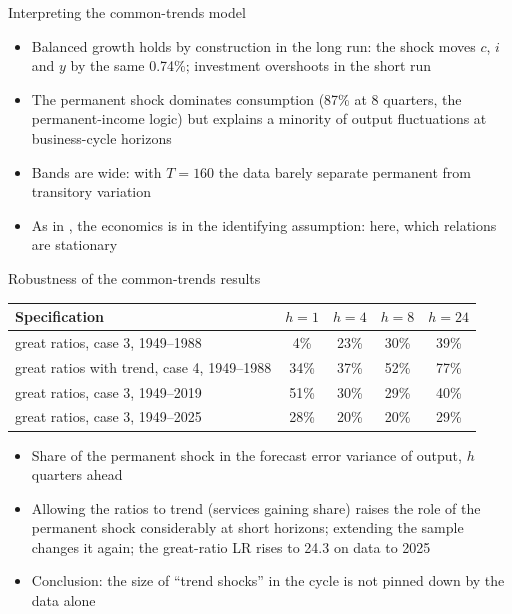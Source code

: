 \begin{frame}{Interpreting the common-trends model}
\itemsize{\small}
\begin{itemize}
    \item Balanced growth holds by construction in the long run: the shock moves $c$, $i$ and $y$ by the same 0.74\%; investment overshoots in the short run
    \item The permanent shock dominates consumption (87\% at 8 quarters, the permanent-income logic) but explains a minority of output fluctuations at business-cycle horizons
    \item Bands are wide: with $T = 160$ the data barely separate permanent from transitory variation
    \item As in , the economics is in the identifying assumption: here, which relations are stationary
\end{itemize}
\end{frame}

\begin{frame}{Robustness of the common-trends results}
\itemsize{\small}
\begin{center}
\footnotesize
\begin{tabular}{lcccc}
\toprule
\textbf{Specification} & $h = 1$ & $h = 4$ & $h = 8$ & $h = 24$ \\
\midrule
great ratios, case 3, 1949--1988 & 4\% & 23\% & 30\% & 39\% \\
great ratios with trend, case 4, 1949--1988 & 34\% & 37\% & 52\% & 77\% \\
great ratios, case 3, 1949--2019 & 51\% & 30\% & 29\% & 40\% \\
great ratios, case 3, 1949--2025 & 28\% & 20\% & 20\% & 29\% \\
\bottomrule
\end{tabular}
\end{center}
\begin{itemize}
    \item Share of the permanent shock in the forecast error variance of output, $h$ quarters ahead
    \item Allowing the ratios to trend (services gaining share) raises the role of the permanent shock considerably at short horizons; extending the sample changes it again; the great-ratio LR rises to 24.3 on data to 2025
    \item Conclusion: the size of ``trend shocks'' in the cycle is not pinned down by the data alone
\end{itemize}
\end{frame}

